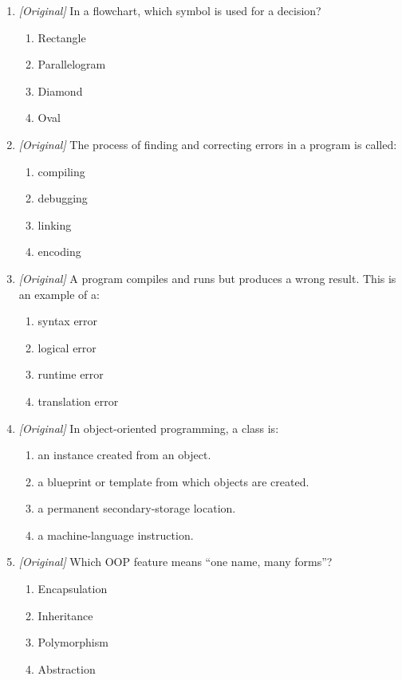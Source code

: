 \begin{enumerate}[label=\textbf{Q\arabic*.}, leftmargin=*]
\begin{enumerate}[label=\Alph*.]
  \end{enumerate}
\item \textit{[Original]} In a flowchart, which symbol is used for a decision?
  \begin{enumerate}[label=\Alph*.]
    \item Rectangle
    \item Parallelogram
    \item Diamond
    \item Oval
  \end{enumerate}
\item \textit{[Original]} The process of finding and correcting errors in a
  program is called:
  \begin{enumerate}[label=\Alph*.]
    \item compiling
    \item debugging
    \item linking
    \item encoding
  \end{enumerate}
\item \textit{[Original]} A program compiles and runs but produces a wrong
  result. This is an example of a:
  \begin{enumerate}[label=\Alph*.]
    \item syntax error
    \item logical error
    \item runtime error
    \item translation error
  \end{enumerate}
\item \textit{[Original]} In object-oriented programming, a class is:
  \begin{enumerate}[label=\Alph*.]
    \item an instance created from an object.
    \item a blueprint or template from which objects are created.
    \item a permanent secondary-storage location.
    \item a machine-language instruction.
  \end{enumerate}
\item \textit{[Original]} Which OOP feature means ``one name, many forms''?
  \begin{enumerate}[label=\Alph*.]
    \item Encapsulation
    \item Inheritance
    \item Polymorphism
    \item Abstraction

\end{enumerate}
\end{enumerate}
